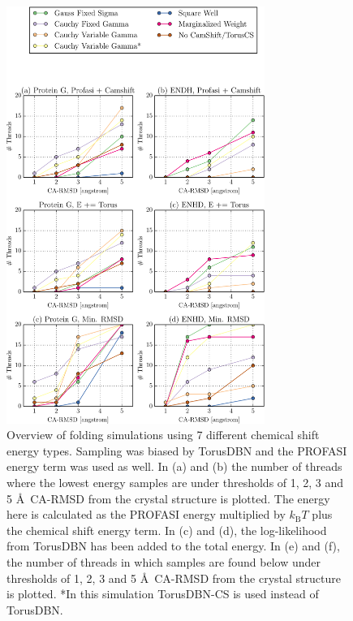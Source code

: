 \begin{figure}%
    \centering
    \includegraphics[width=0.75\textwidth]{figures/cauchy_folds/cauchy_folds.pdf}
    \caption{Overview of folding simulations using 7 different chemical shift energy types. Sampling was biased by TorusDBN and the PROFASI energy term was used as well.
             In (a) and (b) the number of threads where the lowest energy samples are under thresholds of 1, 2, 3 and 5 \AA~CA-RMSD from the crystal structure is plotted. 
             The energy here is calculated as the PROFASI energy multiplied by $k_{\mathrm{B}}T$ plus the chemical shift energy term. 
In (c) and (d), the log-likelihood from TorusDBN has been added to the total energy.
In (e) and (f), the number of threads in which samples are found below under thresholds of 1, 2, 3 and 5 \AA~CA-RMSD from the crystal structure is plotted. 
*In this simulation TorusDBN-CS is used instead of TorusDBN.}
    \label{fig:cauchy_results}%
\end{figure}



